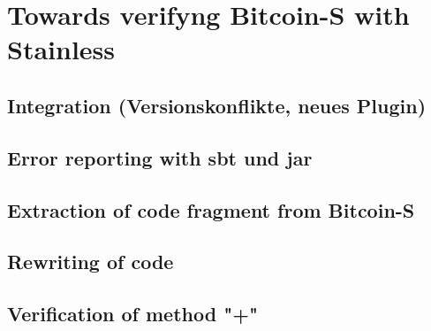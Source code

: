 \chapter{Towards verifyng Bitcoin-S with Stainless}
\label{chap:connecting}

\section{Integration (Versionskonflikte, neues Plugin)}

\section{Error reporting with sbt und jar}

\section{Extraction of code fragment from Bitcoin-S}

\section{Rewriting of code}

\section{Verification of method "+"}